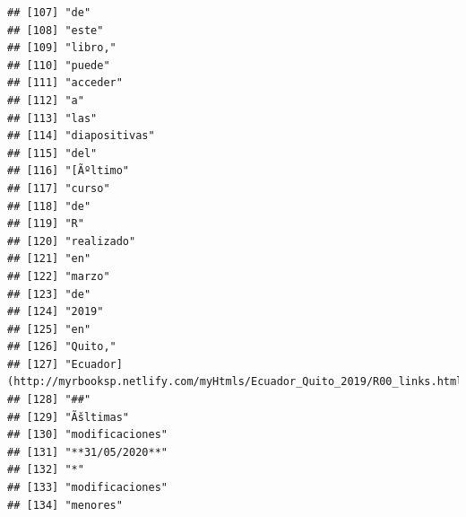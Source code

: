 \documentclass[
]{book}
\begin{document}
\begin{verbatim}
## [107] "de"                                                                               
## [108] "este"                                                                             
## [109] "libro,"                                                                           
## [110] "puede"                                                                            
## [111] "acceder"                                                                          
## [112] "a"                                                                                
## [113] "las"                                                                              
## [114] "diapositivas"                                                                     
## [115] "del"                                                                              
## [116] "[Ãºltimo"                                                                         
## [117] "curso"                                                                            
## [118] "de"                                                                               
## [119] "R"                                                                                
## [120] "realizado"                                                                        
## [121] "en"                                                                               
## [122] "marzo"                                                                            
## [123] "de"                                                                               
## [124] "2019"                                                                             
## [125] "en"                                                                               
## [126] "Quito,"                                                                           
## [127] "Ecuador](http://myrbooksp.netlify.com/myHtmls/Ecuador_Quito_2019/R00_links.html)."
## [128] "##"                                                                               
## [129] "Ãšltimas"                                                                         
## [130] "modificaciones"                                                                   
## [131] "**31/05/2020**"                                                                   
## [132] "*"                                                                                
## [133] "modificaciones"                                                                   
## [134] "menores"                                                                          

\end{verbatim}
\end{document}
